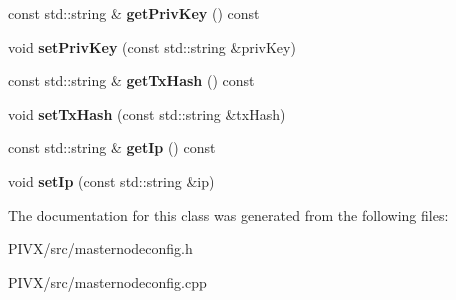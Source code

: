 \begin{DoxyCompactItemize}
\item 
\mbox{\label{class_c_masternode_config_1_1_c_masternode_entry_ab0e21a945e43940b659bf289f9280552}} 
const std\+::string \& {\bfseries get\+Priv\+Key} () const
\item 
\mbox{\label{class_c_masternode_config_1_1_c_masternode_entry_a991176f5739043dab17d262a42e7061b}} 
void {\bfseries set\+Priv\+Key} (const std\+::string \&priv\+Key)
\item 
\mbox{\label{class_c_masternode_config_1_1_c_masternode_entry_a08039c5a3271a278c64a706c4b53d29b}} 
const std\+::string \& {\bfseries get\+Tx\+Hash} () const
\item 
\mbox{\label{class_c_masternode_config_1_1_c_masternode_entry_a32224c906982e19d8b231ed7bc8d27bd}} 
void {\bfseries set\+Tx\+Hash} (const std\+::string \&tx\+Hash)
\item 
\mbox{\label{class_c_masternode_config_1_1_c_masternode_entry_a50b3672f986b569c83bf29e08f8165c8}} 
const std\+::string \& {\bfseries get\+Ip} () const
\item 
\mbox{\label{class_c_masternode_config_1_1_c_masternode_entry_a6dfa8be6875c2718ce05f701158cbbfd}} 
void {\bfseries set\+Ip} (const std\+::string \&ip)
\end{DoxyCompactItemize}


The documentation for this class was generated from the following files\+:\begin{DoxyCompactItemize}
\item 
P\+I\+V\+X/src/masternodeconfig.\+h\item 
P\+I\+V\+X/src/masternodeconfig.\+cpp\end{DoxyCompactItemize}
